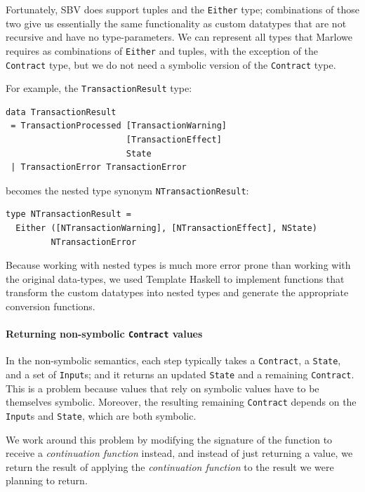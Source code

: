 \documentclass[runningheads]{llncs}
\begin{document}
Fortunately, SBV does support tuples and the \texttt{Either} type; combinations of those two give us essentially the same functionality as custom datatypes that are not recursive and have no type-parameters. We can represent all types that Marlowe requires as combinations of \texttt{Either} and tuples, with the exception of the \texttt{Contract} type, but we do not need a symbolic version of the \texttt{Contract} type.

\noindent
For example, the \texttt{TransactionResult} type:
\begin{verbatim}
data TransactionResult
 = TransactionProcessed [TransactionWarning]
                        [TransactionEffect]
                        State
 | TransactionError TransactionError
\end{verbatim}
\noindent
becomes the nested type synonym \texttt{NTransactionResult}:

\begin{verbatim}
type NTransactionResult =
  Either ([NTransactionWarning], [NTransactionEffect], NState)
         NTransactionError
\end{verbatim}

\noindent
Because working with nested types is much more error prone than working with the original data-types, we used Template Haskell %
to implement functions that transform the custom datatypes into nested types and generate the appropriate conversion functions.

\paragraph{Returning non-symbolic \texttt{Contract} values}

In the non-symbolic semantics, each step typically takes a \texttt{Contract}, a \texttt{State}, and a set of \texttt{Input}s; and it returns an updated \texttt{State} and a remaining \texttt{Contract}. 
This is a problem because values that rely on symbolic values have to be themselves symbolic. Moreover,  the resulting remaining \texttt{Contract} depends on the \texttt{Input}s and \texttt{State}, which are both symbolic.

We work around this problem by  modifying the signature of the function to receive a \textit{continuation function} instead, and instead of just returning a value, we return the result of applying the \textit{continuation function} to the result we were planning to return.
\end{document}
